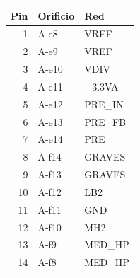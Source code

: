 \begin{tabular}{r l p{39mm}}
\toprule Pin & Orificio & Red\\\midrule
1 & A-e8 & VREF\\
2 & A-e9 & VREF\\
3 & A-e10 & VDIV\\
4 & A-e11 & +3.3VA\\
5 & A-e12 & PRE\_IN\\
6 & A-e13 & PRE\_FB\\
7 & A-e14 & PRE\\
8 & A-f14 & GRAVES\\
9 & A-f13 & GRAVES\\
10 & A-f12 & LB2\\
11 & A-f11 & GND\\
12 & A-f10 & MH2\\
13 & A-f9 & MED\_HP\\
14 & A-f8 & MED\_HP\\
\bottomrule\end{tabular}
